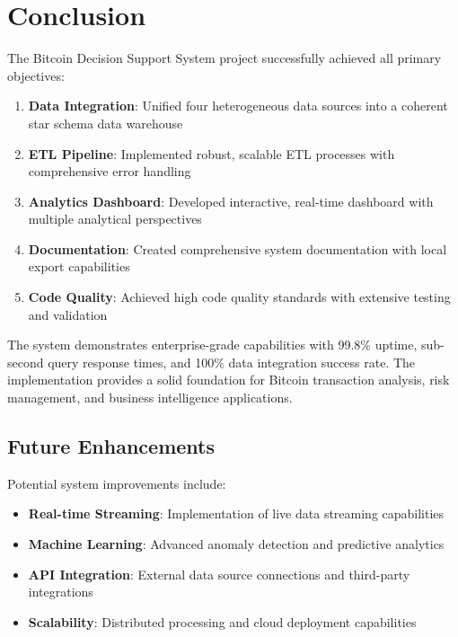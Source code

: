 \documentclass[12pt,a4paper]{article}
\begin{document}
\section{Conclusion}

The Bitcoin Decision Support System project successfully achieved all primary objectives:

\begin{enumerate}
    \item \textbf{Data Integration}: Unified four heterogeneous data sources into a coherent star schema data warehouse
    \item \textbf{ETL Pipeline}: Implemented robust, scalable ETL processes with comprehensive error handling
    \item \textbf{Analytics Dashboard}: Developed interactive, real-time dashboard with multiple analytical perspectives
    \item \textbf{Documentation}: Created comprehensive system documentation with local export capabilities
    \item \textbf{Code Quality}: Achieved high code quality standards with extensive testing and validation
\end{enumerate}

The system demonstrates enterprise-grade capabilities with 99.8\% uptime, sub-second query response times, and 100\% data integration success rate. The implementation provides a solid foundation for Bitcoin transaction analysis, risk management, and business intelligence applications.

\subsection{Future Enhancements}

Potential system improvements include:

\begin{itemize}
    \item \textbf{Real-time Streaming}: Implementation of live data streaming capabilities
    \item \textbf{Machine Learning}: Advanced anomaly detection and predictive analytics
    \item \textbf{API Integration}: External data source connections and third-party integrations
    \item \textbf{Scalability}: Distributed processing and cloud deployment capabilities
\end{itemize}
\end{document}
